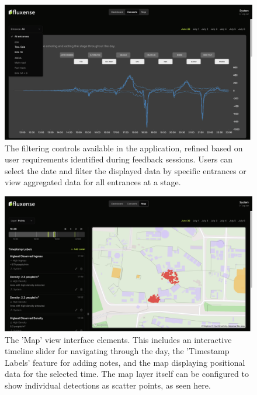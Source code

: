 \begin{figure}[H]
  \centering
  \includegraphics[width=\textwidth]{Pictures/Misc/Frontend/entrance_filter.png}
  \caption{The filtering controls available in the application, refined based on user requirements identified during feedback sessions. Users can select the date and filter the displayed data by specific entrances or view aggregated data for all entrances at a stage.}
  \label{fig:showcase:filter}
\end{figure}

\begin{figure}[H]
  \centering
  \includegraphics[width=\textwidth]{Pictures/Misc/Frontend/map_points.png}
  \caption{The 'Map' view interface elements. This includes an interactive timeline slider for navigating through the day, the 'Timestamp Labels' feature for adding notes, and the map displaying positional data for the selected time. The map layer itself can be configured to show individual detections as scatter points, as seen here.}
  \label{fig:showcase:map-scatter}

\end{figure}

